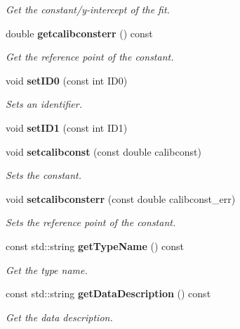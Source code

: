 \begin{DoxyCompactItemize}
\begin{DoxyCompactList}\small\item\em Get the constant/y-\/intercept of the fit. \item\end{DoxyCompactList}\item 
double {\bf getcalibconsterr} () const \label{classCALICE_1_1ScECALIntercalib_aa373eb5069733673817145fc7ae69391}

\begin{DoxyCompactList}\small\item\em Get the reference point of the constant. \item\end{DoxyCompactList}\item 
void {\bf setID0} (const int ID0)\label{classCALICE_1_1ScECALIntercalib_a27c71e4bf4c6276ba3092315c3603f7b}

\begin{DoxyCompactList}\small\item\em Sets an identifier. \item\end{DoxyCompactList}\item 
void {\bfseries setID1} (const int ID1)\label{classCALICE_1_1ScECALIntercalib_a33d8428f552820b934ffdc86573ca8fb}

\item 
void {\bf setcalibconst} (const double calibconst)\label{classCALICE_1_1ScECALIntercalib_a07fad799282b16463c2c9d1734b19d0d}

\begin{DoxyCompactList}\small\item\em Sets the constant. \item\end{DoxyCompactList}\item 
void {\bf setcalibconsterr} (const double calibconst\_\-err)\label{classCALICE_1_1ScECALIntercalib_aa6ebb33f0fe837427dda7b58b3f4554e}

\begin{DoxyCompactList}\small\item\em Sets the reference point of the constant. \item\end{DoxyCompactList}\item 
const std::string {\bf getTypeName} () const 
\begin{DoxyCompactList}\small\item\em Get the type name. \item\end{DoxyCompactList}\item 
const std::string {\bf getDataDescription} () const 
\begin{DoxyCompactList}\small\item\em Get the data description. \item\end{DoxyCompactList}\end{DoxyCompactItemize}


